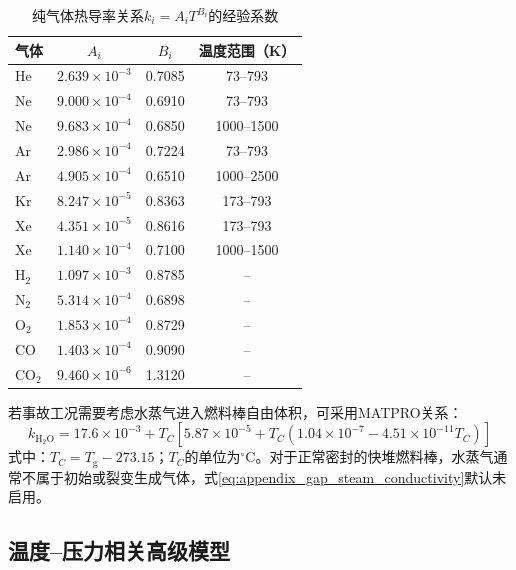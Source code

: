 \begin{table}[htbp]
	\centering
	\caption{纯气体热导率关系$k_i=A_iT^{B_i}$的经验系数}
	\label{tab:appendix_gap_gas_conductivity_coefficients}
	\begin{tabular*}{\textwidth}{
			@{\extracolsep{\fill}}
			lccc
			@{}
		}
		\toprule
		气体 & $A_i$ & $B_i$ & 温度范围（K） \\
		\midrule
		He  & $2.639\times10^{-3}$ & 0.7085 & 73--793 \\
		Ne  & $9.000\times10^{-4}$ & 0.6910 & 73--793 \\
		Ne  & $9.683\times10^{-4}$ & 0.6850 & 1000--1500 \\
		Ar  & $2.986\times10^{-4}$ & 0.7224 & 73--793 \\
		Ar  & $4.905\times10^{-4}$ & 0.6510 & 1000--2500 \\
		Kr  & $8.247\times10^{-5}$ & 0.8363 & 173--793 \\
		Xe  & $4.351\times10^{-5}$ & 0.8616 & 173--793 \\
		Xe  & $1.140\times10^{-4}$ & 0.7100 & 1000--1500 \\
		$\mathrm{H}_2$ & $1.097\times10^{-3}$ & 0.8785 & -- \\
		$\mathrm{N}_2$ & $5.314\times10^{-4}$ & 0.6898 & -- \\
		$\mathrm{O}_2$ & $1.853\times10^{-4}$ & 0.8729 & -- \\
		CO & $1.403\times10^{-4}$ & 0.9090 & -- \\
		$\mathrm{CO}_2$ & $9.460\times10^{-6}$ & 1.3120 & -- \\
		\bottomrule
	\end{tabular*}
\end{table}

若事故工况需要考虑水蒸气进入燃料棒自由体积，可采用MATPRO关系：
\begin{equation}
	k_{\mathrm{H_2O}}
	=17.6\times10^{-3}
	+T_C\left[
	5.87\times10^{-5}
	+T_C\left(1.04\times10^{-7}
	-4.51\times10^{-11}T_C\right)
	\right]
	\label{eq:appendix_gap_steam_conductivity}
\end{equation}
\noindent 式中：$T_C=T_{\mathrm g}-273.15$；$T_C$的单位为$^\circ\mathrm C$。对于正常密封的快堆燃料棒，水蒸气通常不属于初始或裂变生成气体，式\eqref{eq:appendix_gap_steam_conductivity}默认未启用。

\subsection{温度--压力相关高级模型}
\label{app:gap_advanced_gas_conductivity}

